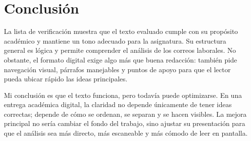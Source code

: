 \documentclass[
	spanish,
	letterpaper, oneside
]{article}
\begin{document}
\section{Conclusión}

La lista de verificación muestra que el texto evaluado cumple con su propósito académico y mantiene un tono adecuado para la asignatura. Su estructura general es lógica y permite comprender el análisis de los correos laborales. No obstante, el formato digital exige algo más que buena redacción: también pide navegación visual, párrafos manejables y puntos de apoyo para que el lector pueda ubicar rápido las ideas principales.

Mi conclusión es que el texto funciona, pero todavía puede optimizarse. En una entrega académica digital, la claridad no depende únicamente de tener ideas correctas; depende de cómo se ordenan, se separan y se hacen visibles. La mejora principal no sería cambiar el fondo del trabajo, sino ajustar su presentación para que el análisis sea más directo, más escaneable y más cómodo de leer en pantalla.


\end{document}
